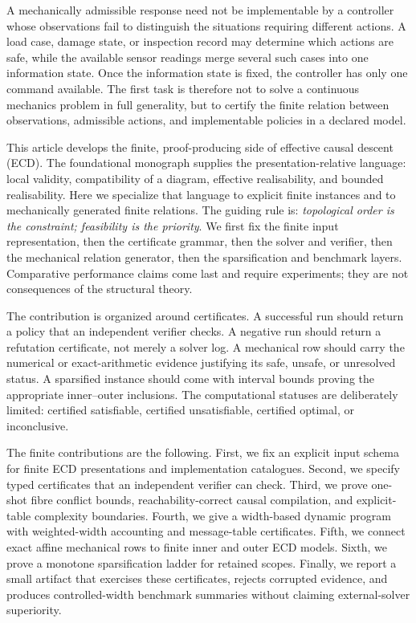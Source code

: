 \documentclass[11pt]{article}
\theoremstyle{plain}
\theoremstyle{definition}
\theoremstyle{remark}
\begin{document}
A mechanically admissible response need not be implementable by a controller
whose observations fail to distinguish the situations requiring different
actions.  A load case, damage state, or inspection record may determine which
actions are safe, while the available sensor readings merge several such cases
into one information state.  Once the information state is fixed, the controller
has only one command available.  The first task is therefore not to solve a
continuous mechanics problem in full generality, but to certify the finite
relation between observations, admissible actions, and implementable policies in
a declared model.

This article develops the finite, proof-producing side of effective causal
descent (ECD).  The foundational monograph supplies the presentation-relative
language: local validity, compatibility of a diagram, effective realisability,
and bounded realisability.  Here we specialize that language to explicit finite
instances and to mechanically generated finite relations.  The guiding rule is:
\emph{topological order is the constraint; feasibility is the priority}.  We
first fix the finite input representation, then the certificate grammar, then
the solver and verifier, then the mechanical relation generator, then the
sparsification and benchmark layers.  Comparative performance claims come last
and require experiments; they are not consequences of the structural theory.

The contribution is organized around certificates.  A successful run should
return a policy that an independent verifier checks.  A negative run should
return a refutation certificate, not merely a solver log.  A mechanical row
should carry the numerical or exact-arithmetic evidence justifying its safe,
unsafe, or unresolved status.  A sparsified instance should come with interval
bounds proving the appropriate inner--outer inclusions.  The computational
statuses are deliberately limited: certified satisfiable, certified
unsatisfiable, certified optimal, or inconclusive.

The finite contributions are the following.  First, we fix an explicit input
schema for finite ECD presentations and implementation catalogues.  Second, we
specify typed certificates that an independent verifier can check.  Third, we
prove one-shot fibre conflict bounds, reachability-correct causal compilation,
and explicit-table complexity boundaries.  Fourth, we give a width-based dynamic
program with weighted-width accounting and message-table certificates.  Fifth,
we connect exact affine mechanical rows to finite inner and outer ECD models.
Sixth, we prove a monotone sparsification ladder for retained scopes.  Finally,
we report a small artifact that exercises these certificates, rejects corrupted
evidence, and produces controlled-width benchmark summaries without claiming
external-solver superiority.
\end{document}
